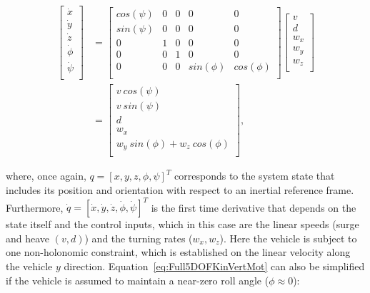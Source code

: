 \begin{equation}
\label{eq:Full5DOFKinVertMot}
\begin{split}
	\begin{bmatrix}
		\dot{x}\\
		\dot{y}\\
		\dot{z}\\
		\dot{\phi}\\ 
		\dot{\psi}\\
	\end{bmatrix} & =
	\begin{bmatrix}
		cos\left(\psi\right) & 0 & 0 & 0 & 0\\
		sin\left(\psi\right) & 0 & 0 & 0 & 0\\
		0 & 1 & 0 & 0 & 0\\
		0 & 0 & 1 & 0 & 0\\
		0 & 0 & 0 & sin\left(\phi\right) & cos\left(\phi\right)\\
	\end{bmatrix}
	\begin{bmatrix}
		v\\
		d\\
		w_x\\
		w_y\\
		w_z\\
	\end{bmatrix}\\
	& = \begin{bmatrix}
		v\ cos\left(\psi\right)\\
		v\ sin\left(\psi\right)\\
		d\\
		w_x\\
		w_y\ sin\left(\phi\right) + w_z\ cos\left(\phi\right)\\
	\end{bmatrix}
	\text{,}
\end{split}
\end{equation}

where, once again, $q=\left[x, y, z, \phi, \psi\right]^T$ corresponds to the
system state that includes its position and orientation with respect to an
inertial reference frame. Furthermore, $\dot{q}=\left[\dot{x}, \dot{y}, \dot{z},
\dot{\phi}, \dot{\psi}\right]^T$ is the first time derivative that depends on
the state itself and the control inputs, which in this case are the linear
speeds (surge and  heave $(v, d)$) and the turning rates ($w_x, w_z$). Here the
vehicle is subject to one non-holonomic constraint, which is established on the
linear velocity along the vehicle $y$ direction.
Equation~\eqref{eq:Full5DOFKinVertMot} can also be simplified if the vehicle is
assumed to maintain a near-zero roll angle ($\phi \approx 0$):

